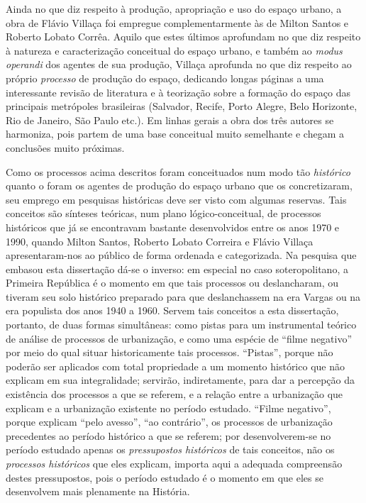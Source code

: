 Ainda no que diz respeito à produção, apropriação e uso do espaço urbano, a obra de Flávio Villaça \cite{villaca_intraurbano_2017} foi empregue complementarmente às de Milton Santos e Roberto Lobato Corrêa. Aquilo que estes últimos aprofundam no que diz respeito à natureza e caracterização conceitual do espaço urbano, e também ao \textit{modus operandi} dos agentes de sua produção, Villaça aprofunda no que diz respeito ao próprio \textit{processo} de produção do espaço, dedicando longas páginas a uma interessante revisão de literatura e à teorização sobre a formação do espaço das principais metrópoles brasileiras (Salvador, Recife, Porto Alegre, Belo Horizonte, Rio de Janeiro, São Paulo etc.). Em linhas gerais a obra dos três autores se harmoniza, pois partem de uma base conceitual muito semelhante e chegam a conclusões muito próximas.

Como os processos acima descritos foram conceituados num modo tão \textit{histórico} quanto o foram os agentes de produção do espaço urbano que os concretizaram, seu emprego em pesquisas históricas deve ser visto com algumas reservas. Tais conceitos são sínteses teóricas, num plano lógico-conceitual, de processos históricos que já se encontravam bastante desenvolvidos entre os anos 1970 e 1990, quando Milton Santos, Roberto Lobato Correira e Flávio Villaça apresentaram-nos ao público de forma ordenada e categorizada. Na pesquisa que embasou esta dissertação dá-se o inverso: em especial no caso soteropolitano, a Primeira República é o momento em que tais processos ou deslancharam, ou tiveram seu solo histórico preparado para que deslanchassem na era Vargas ou na era populista dos anos 1940 a 1960. Servem tais conceitos a esta dissertação, portanto, de duas formas simultâneas: como pistas para um instrumental teórico de análise de processos de urbanização, e como uma espécie de ``filme negativo'' por meio do qual situar historicamente tais processos. ``Pistas'', porque não poderão ser aplicados com total propriedade a um momento histórico que não explicam em sua integralidade; servirão, indiretamente, para dar a percepção da existência dos processos a que se referem, e a relação entre a urbanização que explicam e a urbanização existente no período estudado. ``Filme negativo'', porque explicam ``pelo avesso'', ``ao contrário'', os processos de urbanização precedentes ao período histórico a que se referem; por desenvolverem-se no período estudado apenas os \textit{pressupostos históricos} de tais conceitos, não os \textit{processos históricos} que eles explicam, importa aqui a adequada compreensão destes pressupostos, pois o período estudado é o momento em que eles se desenvolvem mais plenamente na História.


